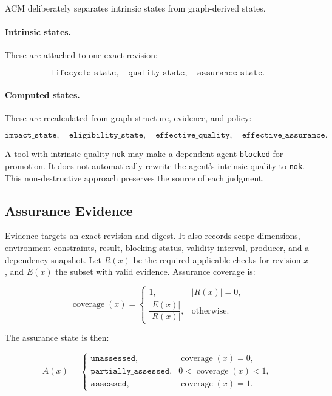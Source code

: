 \documentclass[10pt]{article}
\begin{document}
ACM deliberately separates intrinsic states from graph-derived states.

\paragraph{Intrinsic states.}
These are attached to one exact revision:

\[
\texttt{lifecycle\_state},\quad
\texttt{quality\_state},\quad
\texttt{assurance\_state}.
\]

\paragraph{Computed states.}
These are recalculated from graph structure, evidence, and policy:

\[
\texttt{impact\_state},\quad
\texttt{eligibility\_state},\quad
\texttt{effective\_quality},\quad
\texttt{effective\_assurance}.
\]

A tool with intrinsic quality \texttt{nok} may make a dependent agent \texttt{blocked} for promotion. It does not automatically rewrite the agent's intrinsic quality to \texttt{nok}. This non-destructive approach preserves the source of each judgment.

\subsection{Assurance Evidence}

Evidence targets an exact revision and digest. It also records scope dimensions, environment constraints, result, blocking status, validity interval, producer, and a dependency snapshot. Let $R(x)$ be the required applicable checks for revision $x$, and $E(x)$ the subset with valid evidence. Assurance coverage is:

\begin{equation}
\operatorname{coverage}(x)=
\begin{cases}
1, & |R(x)|=0,\\
\dfrac{|E(x)|}{|R(x)|}, & \text{otherwise.}
\end{cases}
\end{equation}

The assurance state is then:

\begin{equation}
A(x)=
\begin{cases}
\texttt{unassessed}, & \operatorname{coverage}(x)=0,\\
\texttt{partially\_assessed}, & 0<\operatorname{coverage}(x)<1,\\
\texttt{assessed}, & \operatorname{coverage}(x)=1.
\end{cases}
\end{equation}
\end{document}
